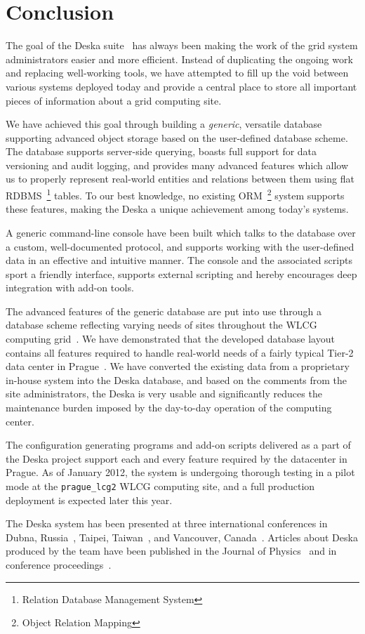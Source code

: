 \documentclass[deska]{subfiles}
\begin{document}
\chapter{Conclusion}
\label{sec:conclusion}

The goal of the Deska suite~\cite{deska-project} has always been making the work of the grid system administrators
easier and more efficient.  Instead of duplicating the ongoing work and replacing well-working tools, we have attempted
to fill up the void between various systems deployed today and provide a central place to store all important pieces of
information about a grid computing site.

We have achieved this goal through building a {\em generic}, versatile database supporting advanced object storage based
on the user-defined database scheme.  The database supports server-side querying, boasts full support for data
versioning and audit logging, and provides many advanced features which allow us to properly represent real-world
entities and relations between them using flat RDBMS~\footnote{Relation Database Management System} tables.  To our best
knowledge, no existing ORM~\footnote{Object Relation Mapping} system supports these features, making the Deska a unique
achievement among today's systems.

A generic command-line console have been built which talks to the database over a custom, well-documented protocol, and
supports working with the user-defined data in an effective and intuitive manner.  The console and the associated
scripts sport a friendly interface, supports external scripting and hereby encourages deep integration with add-on
tools.

The advanced features of the generic database are put into use through a database scheme reflecting varying needs of
sites throughout the WLCG computing grid~\cite{wlcg}.  We have demonstrated that the developed database layout contains
all features required to handle real-world needs of a fairly typical Tier-2 data center in Prague~\cite{farm}.  We have
converted the existing data from a proprietary in-house system into the Deska database, and based on the comments from
the site administrators, the Deska is very usable and significantly reduces the maintenance burden imposed by the
day-to-day operation of the computing center.

The configuration generating programs and add-on scripts delivered as a part of the Deska project support each and every
feature required by the datacenter in Prague.  As of January 2012, the system is undergoing thorough testing in a pilot
mode at the {\tt prague\_lcg2} WLCG computing site, and a full production deployment is expected later this year.

The Deska system has been presented at three international conferences in Dubna, Russia~\cite{dubna-kundrat}, Taipei,
Taiwan~\cite{chep-2010-deska}, and Vancouver, Canada~\cite{hepix-2011-deska}.  Articles about Deska produced by the team
have been published in the Journal of Physics~\cite{jop-deska} and in conference
proceedings~\cite{dubna-deska-proceedings}.
\end{document}
